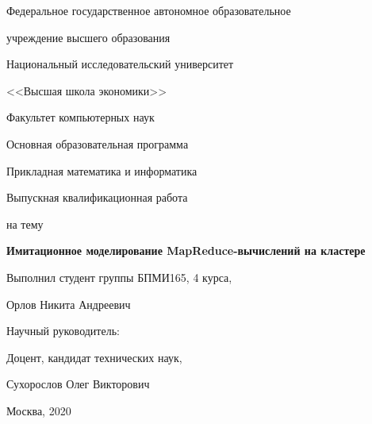 \large
\bigskip

\begin{center}
{\large Федеральное государственное автономное образовательное 

учреждение высшего образования

Национальный исследовательский университет

\smallskip

<<Высшая школа экономики>>

}

\bigskip
\bigskip
\bigskip

{ \large
Факультет компьютерных наук

Основная образовательная программа

Прикладная математика и информатика
}
\end{center}

\begin{center}
  {\large Выпускная квалификационная работа}
  
  {\large на тему}
\end{center}

\begin{center}
  \textbf{\huge Имитационное моделирование MapReduce-вычислений на кластере}
\end{center}


\renewcommand{\arraystretch}{1.8} %

\bigskip
\bigskip
\bigskip
\bigskip

{\large Выполнил студент группы БПМИ165, 4 курса,

\hspace{3cm} Орлов Никита Андреевич


Научный руководитель:

\hspace{3cm} Доцент, кандидат технических наук,

\hspace{3cm} Сухорослов Олег Викторович


\hspace{3cm}

\hspace{3cm}

}
    
\bigskip
\bigskip

\bigskip
\bigskip
\bigskip
\pagestyle{empty}

\vfill
\begin{center}
  {Москва, 2020}
\end{center}
